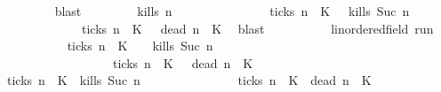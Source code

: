 \begin{isabellebody}
\ \ \ \ \ \ \ \ \isamarkupfalse%
\ blast\isanewline
\ \ \ \ \isacommand{{\isacharbraceright}}\isamarkupfalse%
\ \isamarkupfalse%
\ {\isacartoucheopen}{\isacharbraceleft}{\isasymrho}{\isachardot}\ {\isacharquery}kills\ n\ {\isasymrho}{\isacharbraceright}\isanewline
\ \ \ \ \ \ \ \ \ \ \ {\isasymsubseteq}\ {\isacharbraceleft}{\isasymrho}{\isachardot}\ {\isasymnot}\ {\isacharquery}ticks\ n\ {\isasymrho}\ K\ {\isasyminter}\ {\isacharbraceleft}{\isasymrho}{\isachardot}\ {\isacharquery}kills\ {\isacharparenleft}Suc\ n{\isacharparenright}\ {\isasymrho}{\isacharbraceright}\ \isanewline
\ \ \ \ \ \ \ \ \ \ \ \ {\isasymunion}\ {\isacharbraceleft}{\isasymrho}{\isachardot}\ {\isacharquery}ticks\ n\ {\isasymrho}\ K\ {\isasyminter}\ {\isacharbraceleft}{\isasymrho}{\isachardot}\ {\isacharquery}dead\ n\ {\isasymrho}\ K\ \isamarkupfalse%
\ blast\isanewline
\ \ \isamarkupfalse%
\isanewline
\ \ \ \ \isacommand{{\isacharbraceleft}}\isamarkupfalse%
\ \isamarkupfalse%
\ {\isasymrho}{\isacharcolon}{\isacharcolon}{\isacartoucheopen}{\isacharprime}{\isasymtau}{\isacharcolon}{\isacharcolon}linordered{\isacharunderscore}field\ run{\isacartoucheclose}\isanewline
\ \ \ \ \ \ \isamarkupfalse%
\ {\isacartoucheopen}{\isasymrho}\ {\isasymin}\ {\isacharparenleft}{\isacharbraceleft}{\isasymrho}{\isachardot}\ {\isasymnot}\ {\isacharquery}ticks\ n\ {\isasymrho}\ K\ \ {\isasyminter}\ {\isacharbraceleft}{\isasymrho}{\isachardot}\ {\isacharquery}kills\ {\isacharparenleft}Suc\ n{\isacharparenright}\ {\isasymrho}{\isacharbraceright}{\isacharparenright}\isanewline
\ \ \ \ \ \ \ \ \ \ \ \ \ \ \ \ \ {\isasymunion}\ {\isacharparenleft}{\isacharbraceleft}{\isasymrho}{\isachardot}\ {\isacharquery}ticks\ n\ {\isasymrho}\ K\ {\isasyminter}\ {\isacharbraceleft}{\isasymrho}{\isachardot}\ {\isacharquery}dead\ n\ {\isasymrho}\ K\isanewline
\ \ \ \ \ \ \isamarkupfalse%
\ {\isacartoucheopen}{\isasymnot}\ {\isacharquery}ticks\ n\ {\isasymrho}\ K\ {\isasymand}\ {\isacharquery}kills\ {\isacharparenleft}Suc\ n{\isacharparenright}\ {\isasymrho}\isanewline
\ \ \ \ \ \ \ \ \ \ \ \ \ {\isasymor}\ {\isacharquery}ticks\ n\ {\isasymrho}\ K\ {\isasymand}\ {\isacharquery}dead\ n\ {\isasymrho}\ K\ \isamarkupfalse%

\end{isabellebody}
